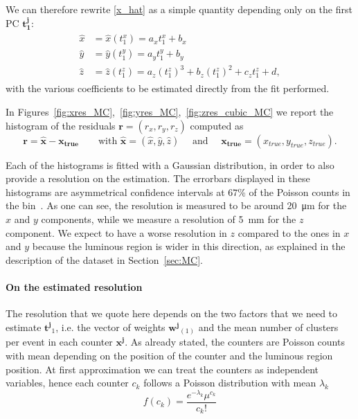 We can therefore rewrite \eqref{x_hat} as a simple quantity depending only on the first PC $\mathbf{t^j_1}$:
\begin{align}
\begin{split}
    \hat{x} &= \hat{x}(t^x_1) = a_x t^x_1 + b_x \\
    \hat{y} &= \hat{y}(t^y_1) = a_y t^y_1 + b_y \\\label{x_hat_true}
    \hat{z} &= \hat{z}(t^z_1) = a_z (t^z_1)^3 + b_z (t^z_1)^2 + c_z  t^z_1 + d,
    \end{split}
\end{align} 
with the various coefficients to be estimated directly from the fit performed. 

In Figures~\ref{fig:xres_MC},~\ref{fig:yres_MC},~\ref{fig:zres_cubic_MC} we report the histogram of the residuals $\mathbf{r}=(r_x, r_y, r_z)$ computed as 
 \begin{equation}
     \mathbf{r}=\hat{\mathbf{x}} - \mathbf{x_{true}} \qquad \text{with } \hat{\mathbf{x}} = (\hat{x}, \hat{y}, \hat{z}) \quad \text{ and } \quad \mathbf{x_{true}}=(x_{true}, y_{true}, z_{true}).
 \end{equation}

 Each of the histograms is fitted with a Gaussian distribution, in order to also provide a resolution on the estimation. The errorbars displayed in these histograms are asymmetrical confidence intervals at $67$\% of the Poisson counts in the bin~\cite{c91e9970-216b-3ca1-adc9-c0f78fd16662}.
 As one can see, the resolution is measured to be around \SI{20}{\micro\meter} for the $x$ and $y$ components, while we measure a resolution of \SI{5}{\milli\meter} for the $z$ component. We expect to have a worse resolution in $z$ compared to the ones in $x$ and $y$ because the luminous region is wider in this direction, as explained in the description of the dataset in Section~\ref{sec:MC}.
 \paragraph{On the estimated resolution}
 The resolution that we quote here depends on the two factors that we need to estimate $\mathbf{t^{j}}_{1}$, i.e. the vector of weights $\mathbf{w^j}_{(1)}$ and the mean number of clusters per event in each counter $\mathbf{x^{j}}$. As already stated, the counters are Poisson counts with mean depending on the position of the counter and the luminous region position. At first approximation we can treat the counters as independent variables, hence each counter $c_k$ follows a Poisson distribution with mean $\lambda_k$
 \begin{equation}
     f(c_k) = \frac{e^{-\lambda_k} \mu^{c_k}}{c_k!}
 \end{equation}

